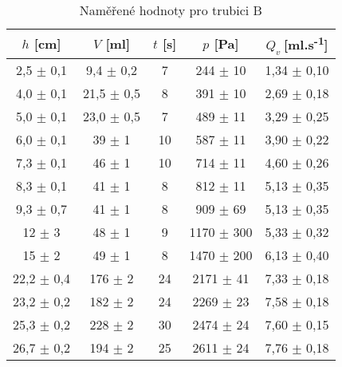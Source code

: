 \begin{table}[htbp]
\centering
\begin{tabular}{|ccccc|}
\hline
$h$ [cm] & $V$ [ml] & $t$ [s] & $p$ [Pa] & $Q_v~$[ml.s\textsuperscript{-1}] \\ \hline
2,5 $\pm$ 0,1 & 9,4 $\pm$ 0,2 & 7 & 244 $\pm$ 10 & 1,34 $\pm$ 0,10 \\ 
4,0 $\pm$ 0,1 & 21,5 $\pm$ 0,5 & 8 & 391 $\pm$ 10 & 2,69 $\pm$ 0,18 \\ 
5,0 $\pm$ 0,1 & 23,0 $\pm$ 0,5 & 7 & 489 $\pm$ 11 & 3,29 $\pm$ 0,25 \\ 
6,0 $\pm$ 0,1 & 39 $\pm$ 1 & 10 & 587 $\pm$ 11 & 3,90 $\pm$ 0,22 \\ 
7,3 $\pm$ 0,1 & 46 $\pm$ 1 & 10 & 714 $\pm$ 11 & 4,60 $\pm$ 0,26 \\ 
8,3 $\pm$ 0,1 & 41 $\pm$ 1 & 8 & 812 $\pm$ 11 & 5,13 $\pm$ 0,35 \\ 
9,3 $\pm$ 0,7 & 41 $\pm$ 1 & 8 & 909 $\pm$ 69 & 5,13 $\pm$ 0,35 \\ 
12 $\pm$ 3 & 48 $\pm$ 1 & 9 & 1170 $\pm$ 300 & 5,33 $\pm$ 0,32 \\ 
15 $\pm$ 2 & 49 $\pm$ 1 & 8 & 1470 $\pm$ 200 & 6,13 $\pm$ 0,40 \\ 
22,2 $\pm$ 0,4 & 176 $\pm$ 2 & 24 & 2171 $\pm$ 41 & 7,33 $\pm$ 0,18 \\ 
23,2 $\pm$ 0,2 & 182 $\pm$ 2 & 24 & 2269 $\pm$ 23 & 7,58 $\pm$ 0,18 \\ 
25,3 $\pm$ 0,2 & 228 $\pm$ 2 & 30 & 2474 $\pm$ 24 & 7,60 $\pm$ 0,15 \\ 
26,7 $\pm$ 0,2 & 194 $\pm$ 2 & 25 & 2611 $\pm$ 24 & 7,76 $\pm$ 0,18 \\  \hline
\end{tabular}
\caption{Naměřené hodnoty pro trubici B}
\label{tab:vysledkyB}
\end{table}


